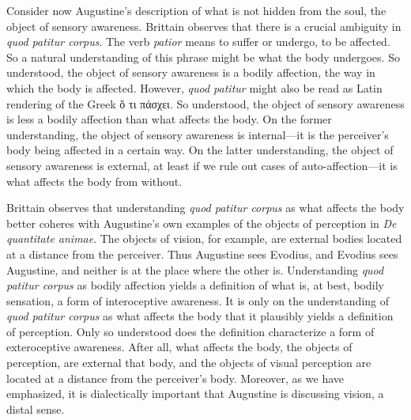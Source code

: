 \documentclass[12pt]{article}
\begin{document}
Consider now Augustine's description of what is not hidden from the soul, the object of sensory awareness. Brittain observes that there is a crucial ambiguity in \emph{quod patitur corpus}. The verb \emph{patior} means to suffer or undergo, to be affected. So a natural understanding of this phrase might be what the body undergoes. So understood, the object of sensory awareness is a bodily affection, the way in which the body is affected. However, \emph{quod patitur} might also be read as Latin rendering of the Greek {\sbl ὅ τι πάσχει}. So understood, the object of sensory awareness is less a bodily affection than what affects the body. On the former understanding, the object of sensory awareness is internal---it is the perceiver's body being affected in a certain way. On the latter understanding, the object of sensory awareness is external, at least if we rule out cases of auto-affection---it is what affects the body from without. 

Brittain observes that understanding \emph{quod patitur corpus} as what affects the body better coheres with Augustine's own examples of the objects of perception in \emph{De quantitate animae}. The objects of vision, for example, are external bodies located at a distance from the perceiver. Thus Augustine sees Evodius, and Evodius sees Augustine, and neither is at the place where the other is.
Understanding \emph{quod patitur corpus} as bodily affection yields a definition of what is, at best, bodily sensation, a form of interoceptive awareness. It is only on the understanding of \emph{quod patitur corpus} as what affects the body that it plausibly yields a definition of perception. Only so understood does the definition characterize a form of exteroceptive awareness. After all, what affects the body, the objects of perception, are external that body, and the objects of visual perception are located at a distance from the perceiver's body.  Moreover, as we have emphasized, it is dialectically important that Augustine is discussing vision, a distal sense.

\end{document}
